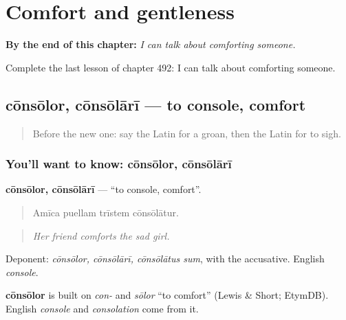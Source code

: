 
\chapter{Comfort and gentleness}
\label{ch:la-comfort-and-gentleness}

\begin{chapteropening}
\textbf{By the end of this chapter:} \emph{I can talk about comforting someone.}

Complete the last lesson of chapter 492: I can talk about comforting someone.
\end{chapteropening}

\section[cōnsōlor, cōnsōlārī]{cōnsōlor, cōnsōlārī — to console, comfort}

\label{lesson:LA-C492-consolor}



\begin{quote}
Before the new one: say the Latin for a groan, then the Latin for to sigh.
\end{quote}

\subsection*{You'll want to know: cōnsōlor, cōnsōlārī}
\textbf{cōnsōlor, cōnsōlārī} — \textquotedblleft{}to console, comfort\textquotedblright{}.

\begin{quote}
Amīca puellam trīstem cōnsōlātur.
\end{quote}

\begin{quote}
\emph{Her friend comforts the sad girl.}
\end{quote}

Deponent: \emph{cōnsōlor, cōnsōlārī, cōnsōlātus sum}, with the accusative. English \emph{console}.

\begin{cousinweb}
\textbf{cōnsōlor} is built on \emph{con-} and \emph{sōlor} \textquotedblleft{}to comfort\textquotedblright{} (Lewis \& Short; EtymDB). English \emph{console} and \emph{consolation} come from it.
\end{cousinweb}

